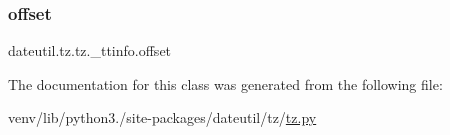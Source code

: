 \mbox{\label{classdateutil_1_1tz_1_1tz_1_1__ttinfo_a77dcc7994f1646124a51cc7cb011da98}} 
\subsubsection{\texorpdfstring{offset}{offset}}
{\footnotesize\ttfamily dateutil.\+tz.\+tz.\+\_\+ttinfo.\+offset}



The documentation for this class was generated from the following file\+:\begin{DoxyCompactItemize}
\item 
venv/lib/python3./site-\/packages/dateutil/tz/\hyperlink{tz_8py}{tz.\+py}\end{DoxyCompactItemize}
